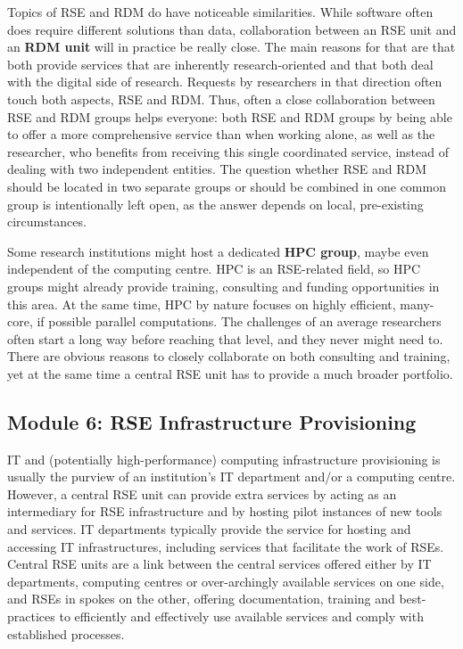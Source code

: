 \documentclass[a4paper]{article}
\begin{document}
Topics of RSE and RDM do have noticeable similarities.
While software often does require different solutions than data, collaboration between an RSE unit and an \textbf{RDM unit} will in practice be really close.
The main reasons for that are that both provide services that are inherently research-oriented and that both deal with the digital side of research.
Requests by researchers in that direction often touch both aspects, RSE and RDM\@.
Thus, often a close collaboration between RSE and RDM groups helps everyone: both RSE and RDM groups by being able to offer a more comprehensive service than when working alone, as well as the researcher, who benefits from receiving this single coordinated service, instead of dealing with two independent entities.
The question whether RSE and RDM should be located in two separate groups or should be combined in one common group is intentionally left open, as the answer depends on local, pre-existing circumstances.

Some research institutions might host a dedicated \textbf{HPC group}, maybe even independent of the computing centre.
HPC is an RSE-related field, so HPC groups might already provide training, consulting and funding opportunities in this area.
At the same time, HPC by nature focuses on highly efficient, many-core, if possible parallel computations.
The challenges of an average researchers often start a long way before reaching that level, and they never might need to.
There are obvious reasons to closely collaborate on both consulting and training, yet at the same time a central RSE unit has to provide a much broader portfolio.

\subsection{Module 6: RSE Infrastructure Provisioning}%
\label{sec:infrastructure}

IT and (potentially high-performance) computing infrastructure provisioning is usually the purview of an institution's IT department and/or a computing centre.
However, a central RSE unit can provide extra services by acting as an intermediary for RSE infrastructure and by hosting pilot instances of new tools and services.
IT departments typically provide the service for hosting and accessing IT infrastructures, including services that facilitate the work of RSEs.
Central RSE units are a link between the central services offered either by IT departments, computing centres or over-archingly available services on one side,
and RSEs in spokes on the other, offering documentation, training and best-practices to efficiently and effectively use available services and comply with established processes.
\end{document}
